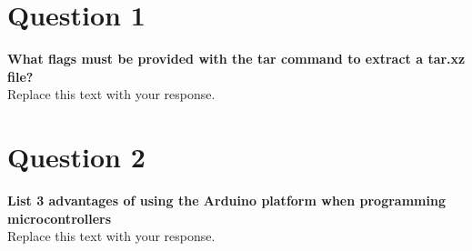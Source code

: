 \documentclass{article}
\begin{document}

\section{Question 1}
\textbf{What flags must be provided with the tar command to extract a tar.xz file?}\\ 

Replace this text with your response.

\section{Question 2}
\textbf{List 3 advantages of using the Arduino platform when programming microcontrollers}\\

Replace this text with your response.
\end{document}
